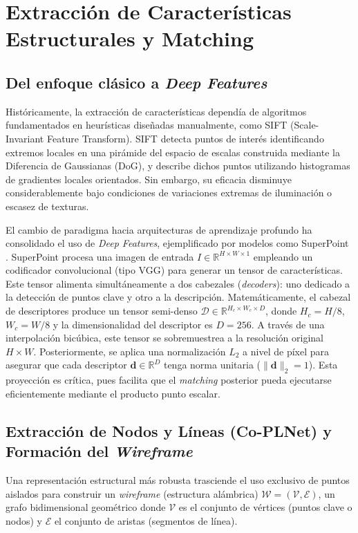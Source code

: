\section{Extracción de Características Estructurales y Matching}

\subsection{Del enfoque clásico a \textit{Deep Features}}
Históricamente, la extracción de características dependía de algoritmos fundamentados en heurísticas diseñadas manualmente, como SIFT (Scale-Invariant Feature Transform). SIFT detecta puntos de interés identificando extremos locales en una pirámide del espacio de escalas construida mediante la Diferencia de Gaussianas (DoG), y describe dichos puntos utilizando histogramas de gradientes locales orientados. Sin embargo, su eficacia disminuye considerablemente bajo condiciones de variaciones extremas de iluminación o escasez de texturas.

El cambio de paradigma hacia arquitecturas de aprendizaje profundo ha consolidado el uso de \textit{Deep Features}, ejemplificado por modelos como SuperPoint \cite{detone2018superpoint}. SuperPoint procesa una imagen de entrada $I \in \mathbb{R}^{H \times W \times 1}$ empleando un codificador convolucional (tipo VGG) para generar un tensor de características. Este tensor alimenta simultáneamente a dos cabezales (\textit{decoders}): uno dedicado a la detección de puntos clave y otro a la descripción. Matemáticamente, el cabezal de descriptores produce un tensor semi-denso $\mathcal{D} \in \mathbb{R}^{H_c \times W_c \times D}$, donde $H_c = H/8$, $W_c = W/8$ y la dimensionalidad del descriptor es $D=256$. A través de una interpolación bicúbica, este tensor se sobremuestrea a la resolución original $H \times W$. Posteriormente, se aplica una normalización $L_2$ a nivel de píxel para asegurar que cada descriptor $\mathbf{d} \in \mathbb{R}^D$ tenga norma unitaria ($\|\mathbf{d}\|_2 = 1$). Esta proyección es crítica, pues facilita que el \textit{matching} posterior pueda ejecutarse eficientemente mediante el producto punto escalar.

\subsection{Extracción de Nodos y Líneas (Co-PLNet) y Formación del \textit{Wireframe}}
Una representación estructural más robusta trasciende el uso exclusivo de puntos aislados para construir un \textit{wireframe} (estructura alámbrica) $\mathcal{W} = (\mathcal{V}, \mathcal{E})$, un grafo bidimensional geométrico donde $\mathcal{V}$ es el conjunto de vértices (puntos clave o nodos) y $\mathcal{E}$ el conjunto de aristas (segmentos de línea).

